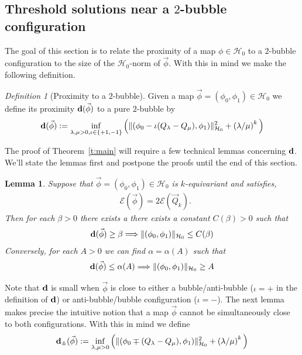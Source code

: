 \documentclass[10pt,reqno]{amsart}
\newcommand{\E}{\mathcal{E}}
\newcommand{\HH}{\mathcal{H}}
\newcommand{\al}{\alpha}
\newcommand{\be}{\beta}
\newcommand{\de}{\delta}
\newcommand{\la}{\lambda}
\newcommand{\EQ}[1]{\begin{equation}\begin{split} #1 \end{split}\end{equation}}
\numberwithin{equation}{section}
\newtheorem{lem}[thm]{Lemma}
\theoremstyle{remark}
\newtheorem{defn}[thm]{Definition}
\newcommand{\0}{\emptyset}
\newcommand{\bfd}{{\bf d}}
\begin{document}
 
 \subsection{Threshold solutions near a $2$-bubble configuration} 
 The goal of this section is to relate the proximity of a map $\phi \in \HH_0$ to a $2$-bubble configuration to the size of the $\HH_0$-norm of $\vec \phi$. With this in mind we make the following definition. 

 \begin{defn}[Proximity to a $2$-bubble]\label{d:ddef} Given a map $ \vec\phi =  (\phi_0, \phi_1) \in \HH_0$ we define its proximity $\bfd(\vec \phi)$ to a pure $2$-bubble by 
\EQ{ \label{eq:ddef} 
\bfd(\vec \phi) := \inf_{\la, \mu >0, \iota \in \{+1, -1\}}  \Big(  \| (\phi_0 - \iota (Q_\la - Q_\mu), \phi_1) \|_{\HH_0}^2 + \left( \la/\mu \right)^k \Big)
}
\end{defn}


The proof of Theorem~\ref{t:main} will require a few technical lemmas concerning $\bfd$. We'll state the lemmas first and postpone the proofs until the end of this section. 
 
 \begin{lem} \label{l:d-size}
 Suppose that $\vec \phi = (\phi_0, \phi_1) \in \HH_0$ is $k$-equivariant and satisfies, 
\EQ{
&\E( \vec \phi)  = 2 \E(\vec Q_k). 
 }
  Then for each $\be>0$ there exists a there exists a constant $C(\be)>0$ such that 
 \EQ{ \label{eq:d-big} 
  \bfd(\vec \phi) \ge \be \Longrightarrow  \|(\phi_0, \phi_1) \|_{\HH_0} \le C(\be) 
   } 
Conversely, for each $A>0$ we can find $\al  = \al(A)$ such that 
\EQ{\label{eq:d-small}
 \bfd(\vec \phi) \le \al(A) \Longrightarrow \|(\phi_0, \phi_1) \|_{\HH_0}  \ge A
}
%
 \end{lem}
 
 Note that $\bfd$ is small when $\vec \phi$ is close to either a bubble/anti-bubble ($\iota= +$ in the definition of $\bfd$) or anti-bubble/bubble configuration ($\iota = -$). The next lemma makes precise the intuitive notion that a map $\vec \phi$ cannot be simultaneously close to both configurations. With this in mind we define 
 \EQ{\label{eq:dpm} 
 \bfd_\pm(\vec \phi) := \inf_{\la, \mu >0}  \Big(  \| (\phi_0  \mp  (Q_\la - Q_\mu), \phi_1) \|_{\HH_0}^2 + \left( \la/\mu \right)^k \Big)
 }
 
\end{document}
